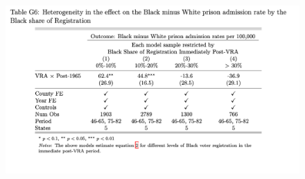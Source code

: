 \documentclass[12pt]{article}
\begin{document}
\begin{figure}
	\centering
	\includegraphics[width=\textwidth]{../../60_appendix_cty_results/table_g6.png}
\end{figure}

\end{document}
